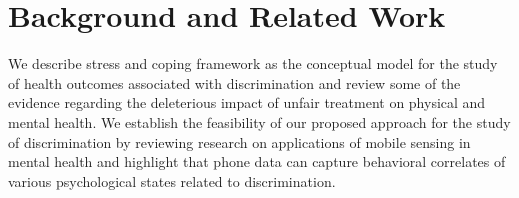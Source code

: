 \section{Background and Related Work}
\label{sec:back}
\noindent We describe stress and coping framework as the conceptual model for the study of health outcomes associated with discrimination and review some of the evidence regarding the deleterious impact of unfair treatment on physical and mental health. We establish the feasibility of our proposed approach for the study of discrimination by reviewing research on applications of mobile sensing in mental health and highlight that phone data can capture behavioral correlates of various psychological states related to discrimination.

